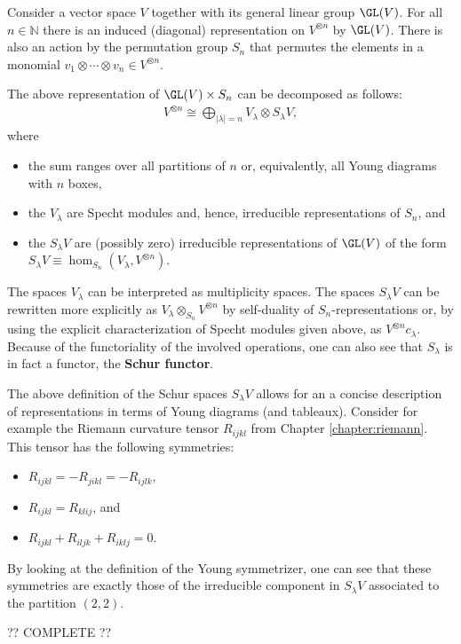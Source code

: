     Consider a vector space $V$ together with its general linear group $\GL(V)$. For all $n\in\mathbb{N}$ there is an induced (diagonal) representation on $V^{\otimes n}$ by $\GL(V)$. There is also an action by the permutation group $S_n$ that permutes the elements in a monomial $v_1\otimes\cdots\otimes v_n\in V^{\otimes n}$.
    \begin{theorem}
        The above representation of $\GL(V)\times S_n$ can be decomposed as follows:
        \begin{gather}
            V^{\otimes n}\cong\bigoplus_{|\lambda|=n}V_\lambda\otimes S_\lambda V,
        \end{gather}
        where
        \begin{itemize}
            \item the sum ranges over all partitions of $n$ or, equivalently, all Young diagrams with $n$ boxes,
            \item the $V_\lambda$ are Specht modules and, hence, irreducible representations of $S_n$, and
            \item the $S_\lambda V$ are (possibly zero) irreducible representations of $\GL(V)$ of the form $S_\lambda V \equiv\hom_{S_n}(V_\lambda,V^{\otimes n})$.
        \end{itemize}
    \end{theorem}
    The spaces $V_\lambda$ can be interpreted as multiplicity spaces. The spaces $S_\lambda V$ can be rewritten more explicitly as $V_\lambda\otimes_{S_n} V^{\otimes n}$ by self-duality of $S_n$-representations or, by using the explicit characterization of Specht modules given above, as $V^{\otimes n}c_\lambda$. Because of the functoriality of the involved operations, one can also see that $S_\lambda$ is in fact a functor, the \textbf{Schur functor}.

    \begin{example}
        The above definition of the Schur spaces $S_\lambda V$ allows for an a concise description of representations in terms of Young diagrams (and tableaux). Consider for example the Riemann curvature tensor $R_{ijkl}$ from Chapter \ref{chapter:riemann}. This tensor has the following symmetries:
        \begin{itemize}
            \item $R_{ijkl} = -R_{jikl} = -R_{ijlk}$,
            \item $R_{ijkl} = R_{klij}$, and
            \item $R_{ijkl} + R_{iljk} + R_{iklj} = 0$.
        \end{itemize}
        By looking at the definition of the Young symmetrizer, one can see that these symmetries are exactly those of the irreducible component in $S_\lambda V$ associated to the partition $(2,2)$.

        ?? COMPLETE ??
    \end{example}

